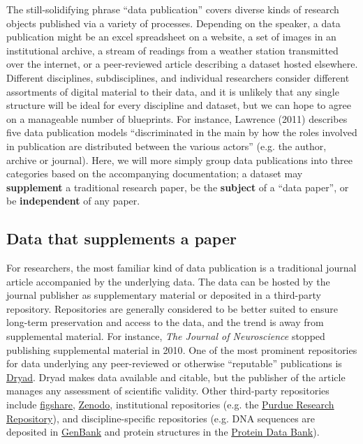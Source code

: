 \documentclass[10pt,twocolumn]{article}
\begin{document}
The still-solidifying phrase ``data publication'' covers diverse kinds of research objects published via a variety of processes.
Depending on the speaker, a data publication might be an excel spreadsheet on a website, a set of images in an institutional archive, a stream of readings from a weather station transmitted over the internet, or a peer-reviewed article describing a dataset hosted elsewhere.
Different disciplines, subdisciplines, and individual researchers consider different assortments of digital material to their data, and it is unlikely that any single structure will be ideal for every discipline and dataset, but we can hope to agree on a manageable number of blueprints.
For instance, Lawrence (2011) describes five data publication models ``discriminated in the main by how the roles involved in publication are distributed between the various actors'' (e.g. the author, archive or journal).\cite{lawrence_data_2011}
Here, we will more simply group data publications into three categories based on the accompanying documentation; a dataset may \textbf{supplement} a traditional research paper, be the \textbf{subject} of a ``data paper'', or be \textbf{independent} of any paper.

\subsection*{Data that supplements a paper}\label{paper-supplement-data}

For researchers, the most familiar kind of data publication is a traditional journal article accompanied by the underlying data.
The data can be hosted by the journal publisher as supplementary material or deposited in a third-party repository.
Repositories are generally considered to be better suited to ensure long-term preservation and access to the data, and the trend is away from supplemental material. 
For instance, \textit{The Journal of Neuroscience} stopped publishing supplemental material in 2010\cite{maunsell_announcement_2010}. %
One of the most prominent repositories for data underlying any peer-reviewed or otherwise ``reputable'' publications is \href{http://www.datadryad.org/}{Dryad}. 
Dryad makes data available and citable, but the publisher of the article manages any assessment of scientific validity.
Other third-party repositories include \href{http://figshare.com/}{figshare}, \href{http://zenodo.org/}{Zenodo}, institutional repositories (e.g. the \href{https://purr.purdue.edu/}{Purdue Research Repository}), and discipline-specific repositories (e.g. DNA sequences are deposited in \href{http://www.ncbi.nlm.nih.gov/genbank/}{GenBank}\cite{benson_genbank_2013} and protein structures in the \href{http://www.rcsb.org/}{Protein Data Bank}\cite{berman_protein_2000}).
\end{document}
